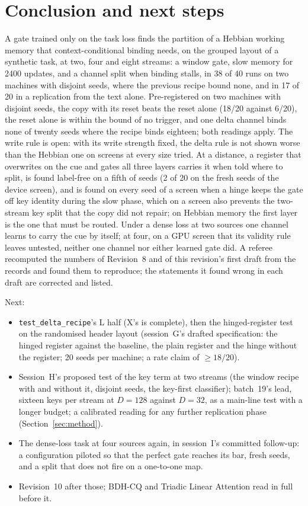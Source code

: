 \documentclass[11pt]{article}
\begin{document}
\section{Conclusion and next steps}

A gate trained only on the task loss finds the partition of a Hebbian working memory that context-conditional binding needs, on the grouped layout of a synthetic task, at two, four and eight streams: a window gate, slow memory for 2400 updates, and a channel split when binding stalls, in 38 of 40 runs on two machines with disjoint seeds, where the previous recipe bound none, and in 17 of 20 in a replication from the text alone. Pre-registered on two machines with disjoint seeds, the copy with its reset beats the reset alone (18/20 against 6/20), the reset alone is within the bound of no trigger, and one delta channel binds none of twenty seeds where the recipe binds eighteen; both readings apply. The write rule is open: with its write strength fixed, the delta rule is not shown worse than the Hebbian one on screens at every size tried. At a distance, a register that overwrites on the cue and gates all three layers carries it when told where to split, is found label-free on a fifth of seeds (2 of 20 on the fresh seeds of the device screen), and is found on every seed of a screen when a hinge keeps the gate off key identity during the slow phase, which on a screen also prevents the two-stream key split that the copy did not repair; on Hebbian memory the first layer is the one that must be routed. Under a dense loss at two sources one channel learns to carry the cue by itself; at four, on a GPU screen that its validity rule leaves untested, neither one channel nor either learned gate did. A referee recomputed the numbers of Revision~8 and of this revision's first draft from the records and found them to reproduce; the statements it found wrong in each draft are corrected and listed.

Next:
\begin{itemize}
\item \texttt{test\_delta\_recipe}'s L half (X's is complete), then the hinged-register test on the randomised header layout (session~G's drafted specification: the hinged register against the baseline, the plain register and the hinge without the register; 20 seeds per machine; a rate claim of $\geq 18/20$).
\item Session~H's proposed test of the key term at two streams (the window recipe with and without it, disjoint seeds, the key-first classifier); batch~19's lead, sixteen keys per stream at $D = 128$ against $D = 32$, as a main-line test with a longer budget; a calibrated reading for any further replication phase (Section~\ref{sec:method}).
\item The dense-loss task at four sources again, in session~I's committed follow-up: a configuration piloted so that the perfect gate reaches its bar, fresh seeds, and a split that does not fire on a one-to-one map.
\item Revision~10 after those; BDH-CQ and Triadic Linear Attention read in full before it.
\end{itemize}
\end{document}
